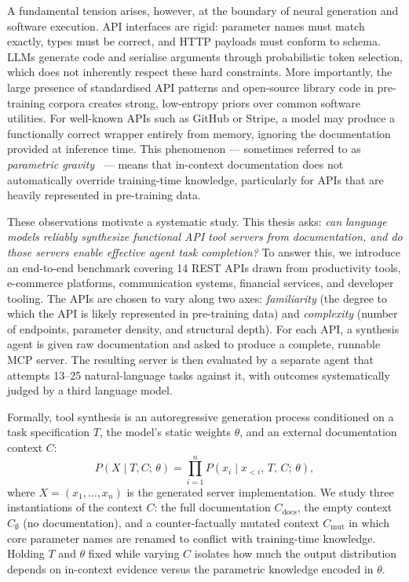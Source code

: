 A fundamental tension arises, however, at the boundary of neural generation and software execution. API interfaces are rigid: parameter names must match exactly, types must be correct, and HTTP payloads must conform to schema. LLMs generate code and serialise arguments through probabilistic token selection, which does not inherently respect these hard constraints. More importantly, the large presence of standardised API patterns and open-source library code in pre-training corpora creates strong, low-entropy priors over common software utilities. For well-known APIs such as GitHub or Stripe, a model may produce a functionally correct wrapper entirely from memory, ignoring the documentation provided at inference time. This phenomenon --- sometimes referred to as \emph{parametric gravity}~\citep{mallen2023knowns,juice2025} --- means that in-context documentation does not automatically override training-time knowledge, particularly for APIs that are heavily represented in pre-training data.

These observations motivate a systematic study. This thesis asks: \emph{can language models reliably synthesize functional API tool servers from documentation, and do those servers enable effective agent task completion?} To answer this, we introduce an end-to-end benchmark covering 14 REST APIs drawn from productivity tools, e-commerce platforms, communication systems, financial services, and developer tooling. The APIs are chosen to vary along two axes: \emph{familiarity} (the degree to which the API is likely represented in pre-training data) and \emph{complexity} (number of endpoints, parameter density, and structural depth). For each API, a synthesis agent is given raw documentation and asked to produce a complete, runnable MCP server. The resulting server is then
evaluated by a separate agent that attempts 13--25 natural-language tasks against it, with outcomes systematically judged by a third language model.

Formally, tool synthesis is an autoregressive generation process conditioned on a task specification $T$, the model's static weights $\theta$, and an external documentation context $C$:
%
\begin{equation}
  P(X \mid T, C;\, \theta)
  = \prod_{i=1}^{n} P(x_i \mid x_{<i},\, T,\, C;\, \theta),
  \label{eq:synthesis}
\end{equation}
%
where $X = (x_1, \ldots, x_n)$ is the generated server implementation. We study three instantiations of the context $C$: the full documentation $C_{\text{docs}}$, the empty context $C_{\emptyset}$ (no documentation), and a counter-factually mutated context $C_{\text{mut}}$ in which core parameter
names are renamed to conflict with training-time knowledge. Holding $T$ and $\theta$ fixed while varying $C$ isolates how much the output distribution depends on in-context evidence versus the parametric knowledge encoded in $\theta$.

